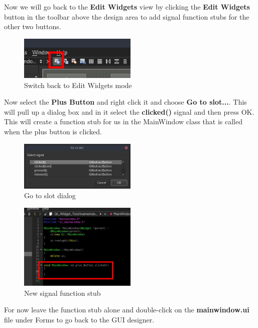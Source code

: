 \documentclass{article}
\begin{document}
Now we will go back to the \textbf{Edit Widgets} view by clicking the \textbf{Edit Widgets} button in the toolbar above the design area to add signal function stubs for the other two buttons.

	\begin{figure}[H]
		\centering
		\includegraphics[width=0.5\textwidth]{pics/Edit_Widgets.png}
		\caption{Switch back to Edit Widgets mode}
		\label{Edit_Widgets}
	\end{figure}

Now select the \textbf{Plus Button} and right click it and choose \textbf{Go to slot...}. This will pull up a dialog box and in it select the \textbf{clicked()} signal and then press OK. This will create a function stub for us in the MainWindow class that is called when the plus button is clicked.

	\begin{figure}[H]
		\centering
		\includegraphics[width=0.5\textwidth]{pics/Go_to_Slot.png}
		\caption{Go to slot dialog}
		\label{Go_to_Slot}
	\end{figure}

	\begin{figure}[H]
		\centering
		\includegraphics[width=0.5\textwidth]{pics/New_Signal.png}
		\caption{New signal function stub}
		\label{New_Signal}
	\end{figure}

For now leave the function stub alone and double-click on the \textbf{mainwindow.ui} file under Forms to go back to the GUI designer.
\end{document}
